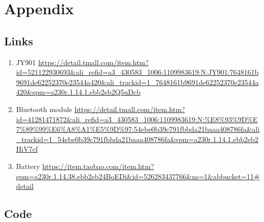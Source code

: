 \section{Appendix}

\subsection{Links}

\begin{enumerate}
\item JY901 
\url{https://detail.tmall.com/item.htm?id=521122930693&ali_refid=a3_430583_1006:1109983619:N:JY901:7648161b9691de62252370e23544a420&ali_trackid=1_7648161b9691de62252370e23544a420&spm=a230r.1.14.1.ebb2eb2Q5uDcb} 

\item  Bluetooth module 
\url{https://detail.tmall.com/item.htm?id=41281471872&ali_refid=a3_430583_1006:1109983619:N:%E8%93%9D%E7%89%99%E6%A8%A1%E5%9D%97:54ebe0b39c791fbbda21baaa408786fa&ali_trackid=1_54ebe0b39c791fbbda21baaa408786fa&spm=a230r.1.14.1.ebb2eb2HiV7cf}
\item  Battery 
\url{https://item.taobao.com/item.htm?spm=a230r.1.14.38.ebb2eb24BoEDi&id=526283437766&ns=1&abbucket=11#detail} 

\end{enumerate}


\subsection{Code}

\inputminted{octave}{scr/scr1.cs}
